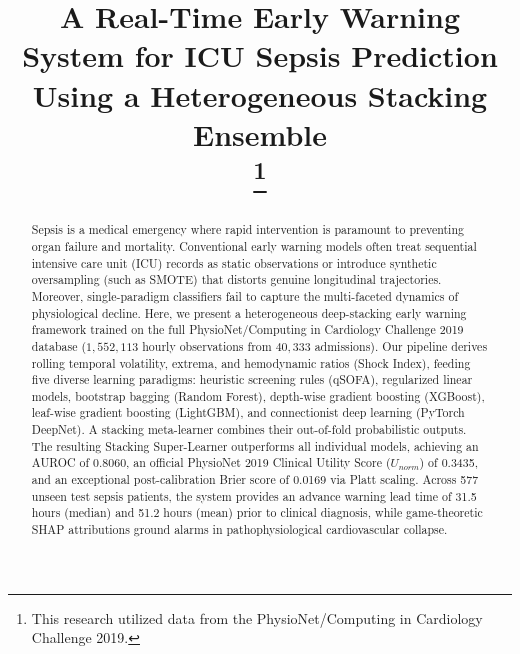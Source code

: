 \documentclass[conference]{IEEEtran}
\begin{document}
\title{A Real-Time Early Warning System for ICU Sepsis Prediction Using a Heterogeneous Stacking Ensemble\\
\thanks{This research utilized data from the PhysioNet/Computing in Cardiology Challenge 2019.}
}

\author{
}

\maketitle

\begin{abstract}
Sepsis is a medical emergency where rapid intervention is paramount to preventing organ failure and mortality. Conventional early warning models often treat sequential intensive care unit (ICU) records as static observations or introduce synthetic oversampling (such as SMOTE) that distorts genuine longitudinal trajectories. Moreover, single-paradigm classifiers fail to capture the multi-faceted dynamics of physiological decline. Here, we present a heterogeneous deep-stacking early warning framework trained on the full PhysioNet/Computing in Cardiology Challenge 2019 database ($1,552,113$ hourly observations from $40,333$ admissions). Our pipeline derives rolling temporal volatility, extrema, and hemodynamic ratios (Shock Index), feeding five diverse learning paradigms: heuristic screening rules (qSOFA), regularized linear models, bootstrap bagging (Random Forest), depth-wise gradient boosting (XGBoost), leaf-wise gradient boosting (LightGBM), and connectionist deep learning (PyTorch DeepNet). A stacking meta-learner combines their out-of-fold probabilistic outputs. The resulting Stacking Super-Learner outperforms all individual models, achieving an AUROC of 0.8060, an official PhysioNet 2019 Clinical Utility Score ($U_{norm}$) of 0.3435, and an exceptional post-calibration Brier score of 0.0169 via Platt scaling. Across 577 unseen test sepsis patients, the system provides an advance warning lead time of 31.5 hours (median) and 51.2 hours (mean) prior to clinical diagnosis, while game-theoretic SHAP attributions ground alarms in pathophysiological cardiovascular collapse.
\end{abstract}
\end{document}
